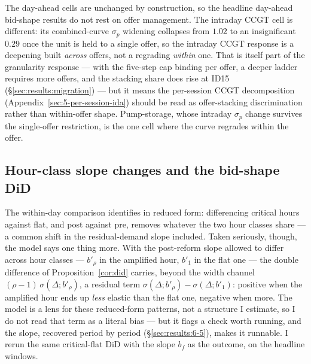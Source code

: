 \documentclass[11pt,a4paper]{article}
\theoremstyle{definition}
\theoremstyle{remark}
\theoremstyle{plain}
\begin{document}
The day-ahead cells are unchanged by construction, so the headline day-ahead bid-shape results do not rest on offer management. The intraday CCGT cell is different: its combined-curve $\sigma_p$ widening collapses from $1.02$ to an insignificant $0.29$ once the unit is held to a single offer, so the intraday CCGT response is a deepening built \emph{across} offers, not a regrading \emph{within} one. That is itself part of the granularity response --- with the five-step cap binding per offer, a deeper ladder requires more offers, and the stacking share does rise at ID15 (\S\ref{sec:results:migration}) --- but it means the per-session CCGT decomposition (Appendix~\ref{sec:5-per-session-ida}) should be read as offer-stacking discrimination rather than within-offer shape. Pump-storage, whose intraday $\sigma_p$ change survives the single-offer restriction, is the one cell where the curve regrades within the offer.

\subsection{Hour-class slope changes and the bid-shape DiD}\label{app:slope-confound}

The within-day comparison identifies in reduced form: differencing critical hours against flat, and post against pre, removes whatever the two hour classes share --- a common shift in the residual-demand slope included. Taken seriously, though, the model says one thing more. With the post-reform slope allowed to differ across hour classes --- $b'_\rho$ in the amplified hour, $b'_1$ in the flat one --- the double difference of Proposition~\ref{cor:did} carries, beyond the width channel $(\rho-1)\,\sigma(\Delta; b'_\rho)$, a residual term $\sigma(\Delta; b'_\rho) - \sigma(\Delta; b'_1)$: positive when the amplified hour ends up \emph{less} elastic than the flat one, negative when more. The model is a lens for these reduced-form patterns, not a structure I estimate, so I do not read that term as a literal bias --- but it flags a check worth running, and the slope, recovered period by period (\S\ref{sec:results:6-5}), makes it runnable. I rerun the same critical-flat DiD with the slope $b_f$ as the outcome, on the headline windows.
\end{document}
